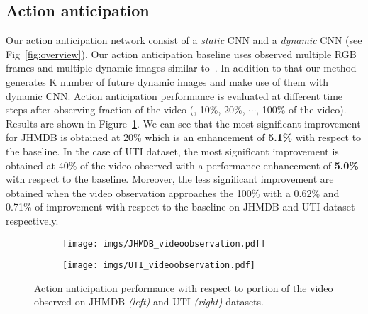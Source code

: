 \subsection{Action anticipation}
\label{sec.act.eva}
Our action anticipation network consist of a {\em static} CNN and a {\em dynamic} CNN (see Fig~\ref{fig:overview}). Our action anticipation baseline uses observed multiple RGB frames and multiple dynamic images similar to~\cite{bilen2016dynamic}. In addition to that our method generates K number of future dynamic images and make use of them with dynamic CNN. Action anticipation performance is evaluated at different time steps after observing fraction of the video (\ie, 10$\%$, 20$\%$, $\cdots$, 100$\%$ of the video). Results are shown in Figure~\ref{fig:ratiovideo}. We can see that the most significant improvement for JHMDB is obtained at 20\% which is an enhancement of \textbf{5.1\%} with respect to the baseline. In the case of UTI dataset, the most significant improvement is obtained at 40\% of the video observed with a performance enhancement of \textbf{5.0\%} with respect to the baseline. Moreover, the less significant improvement are obtained when the video observation approaches the 100\% with a 0.62\% and 0.71\% of improvement with respect to the baseline on JHMDB and UTI dataset respectively.
%
\begin{figure}[t]
  \begin{subfigure}[b]{0.5\textwidth}
    \texttt{[image: imgs/JHMDB\_videoobservation.pdf]}
  \end{subfigure}
  \hfill
  \begin{subfigure}[b]{0.5\textwidth}
    \texttt{[image: imgs/UTI\_videoobservation.pdf]}
  \end{subfigure}
  \caption{Action anticipation performance with respect to portion of the video observed on JHMDB {\em(left)} and UTI {\em (right)} datasets.}
  \label{fig:ratiovideo}
\end{figure}


